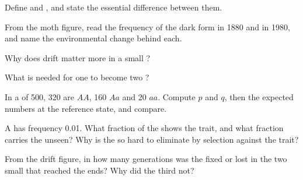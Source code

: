 \begin{exercise}[$\star$]\label{exo:g12:selection-drift-speciation:2}
Define  and , and state the essential
difference between them.
\end{exercise}

\begin{exercise}[$\star$]\label{exo:g12:selection-drift-speciation:3}
From the moth figure, read the frequency of the dark form in 1880 and
in 1980, and name the environmental change behind each.
\end{exercise}

\begin{exercise}[$\star$]\label{exo:g12:selection-drift-speciation:4}
Why does drift matter more in a small ?
\end{exercise}

\begin{exercise}[$\star$]\label{exo:g12:selection-drift-speciation:5}
What is needed for one  to become two ?
\end{exercise}

\begin{exercise}[$\star\star$]\label{exo:g12:selection-drift-speciation:6}
In a  of 500, 320 are $AA$, 160 $Aa$ and 20 $aa$. Compute
$p$ and $q$, then the expected  numbers at the reference
state, and compare.
\end{exercise}

\begin{exercise}[$\star\star$]\label{exo:g12:selection-drift-speciation:7}
A   has frequency 0.01. What fraction of the 
shows the  trait, and what fraction carries the 
unseen? Why is the  so hard to eliminate by selection against
the trait?
\end{exercise}

\begin{exercise}[$\star\star$]\label{exo:g12:selection-drift-speciation:8}
From the drift figure, in how many generations was the  fixed
or lost in the two small  that reached the ends? Why did
the third not?
\end{exercise}

